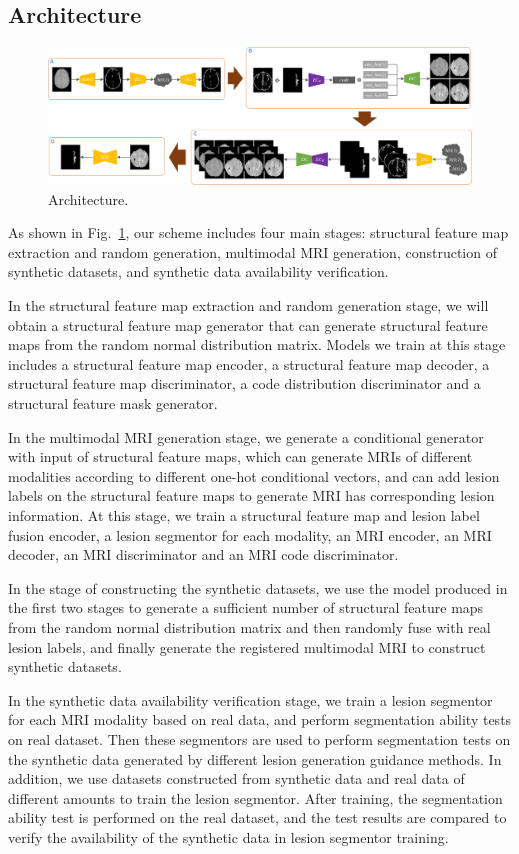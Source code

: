 \documentclass[letterpaper]{article} %
\begin{document}
\subsection{Architecture}
\begin{figure}[t]
	\centering
	\includegraphics[width=0.98\columnwidth]{figures/architecture}
	\caption{Architecture.}
	\label{architecture}
\end{figure}
As shown in Fig.~\ref{architecture}, our scheme includes four main stages: structural feature map extraction and random generation, multimodal MRI generation, construction of synthetic datasets, and synthetic data availability verification.

In the structural feature map extraction and random generation stage, we will obtain a structural feature map generator that can generate structural feature maps from the random normal distribution matrix. Models we train at this stage includes a structural feature map encoder, a structural feature map decoder, a structural feature map discriminator, a code distribution discriminator and a structural feature mask generator.

In the multimodal MRI generation stage, we generate a conditional generator with input of structural feature maps, which can generate MRIs of different modalities according to different one-hot conditional vectors, and can add lesion labels on the structural feature maps to generate MRI has corresponding lesion information. At this stage, we train a structural feature map and lesion label fusion encoder, a lesion segmentor for each modality, an MRI encoder, an MRI decoder, an MRI discriminator and an MRI code discriminator.

In the stage of constructing the synthetic datasets, we use the model produced in the first two stages to generate a sufficient number of structural feature maps from the random normal distribution matrix and then randomly fuse with real lesion labels, and finally generate the registered multimodal MRI to construct synthetic datasets.

In the synthetic data availability verification stage, we train a lesion segmentor for each MRI modality based on real data, and perform segmentation ability tests on real dataset. Then these segmentors are used to perform segmentation tests on the synthetic data generated by different lesion generation guidance methods. In addition, we use datasets constructed from synthetic data and real data of different amounts to train the lesion segmentor. After training, the segmentation ability test is performed on the real dataset, and the test results are compared to verify the availability of the synthetic data in lesion segmentor training.
\end{document}
